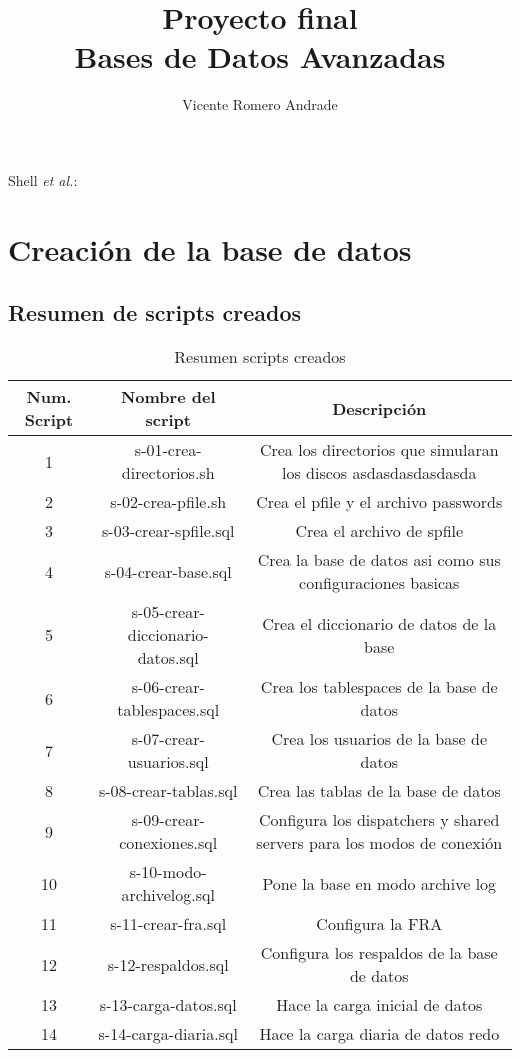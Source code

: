 \documentclass[journal]{IEEEtran}
\begin{document}
\onecolumn
\title{Proyecto final \\ Bases de Datos Avanzadas}
%
\author{Vicente Romero Andrade}

%
{Shell \MakeLowercase{\textit{et al.}}: }

\maketitle

\section{Creación de la base de datos}
\subsection{Resumen de scripts creados}
\begin{table}[H]
  \centering
  \begin{longtable}{|c | c | c|} 
   \hline
   Num. Script & Nombre del script & Descripción \\ [0.5ex] 
   \hline
   1 & s-01-crea-directorios.sh & Crea los directorios que simularan los discos asdasdasdasdasda\\ 
   \hline
   2 & s-02-crea-pfile.sh & Crea el pfile y el archivo passwords \\
   \hline
   3 & s-03-crear-spfile.sql & Crea el archivo de spfile  \\
   \hline
   4 & s-04-crear-base.sql & Crea la base de datos asi como sus configuraciones basicas \\
   \hline
   5 & s-05-crear-diccionario-datos.sql & Crea el diccionario de datos de la base \\
   \hline
   6 & s-06-crear-tablespaces.sql & Crea los tablespaces de la base de datos \\
   \hline
   7 & s-07-crear-usuarios.sql & Crea los usuarios de la base de datos \\
   \hline
   8 & s-08-crear-tablas.sql & Crea las tablas de la base de datos \\
   \hline
   9 & s-09-crear-conexiones.sql & Configura los dispatchers y shared servers para los modos de conexión \\
   \hline
   10 & s-10-modo-archivelog.sql & Pone la base en modo archive log \\
   \hline
   11 & s-11-crear-fra.sql & Configura la FRA \\
   \hline
   12 & s-12-respaldos.sql & Configura los respaldos de la base de datos  \\
   \hline
   13 & s-13-carga-datos.sql & Hace la carga inicial de datos  \\
   \hline
   14 & s-14-carga-diaria.sql & Hace la carga diaria de datos redo \\
   \hline
  \end{longtable}
  \caption{Resumen scripts creados}
  \label{tabla:1}
\end{table}
\end{document}
